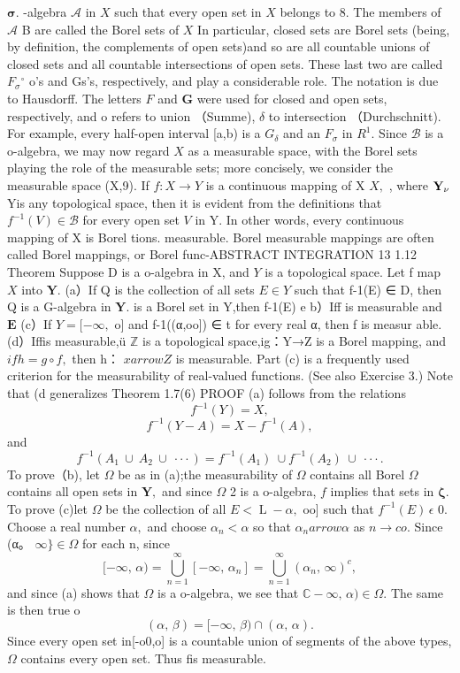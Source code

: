 ${\boldsymbol{\sigma}}.$ -algebra ${\mathcal{A}}$ in $X$ such that every open set in $X$ belongs to 8. The members of ${\mathcal{A}}$ B are called the Borel sets of $\textstyle X$ In particular, closed sets are Borel sets (being, by definition, the complements of open sets)and so are all countable unions of closed sets and all countable intersections of open sets. These last two are called $F_{\sigma}{}^{\circ}$ o's and Gs's, respectively, and play a considerable role. The notation is due to Hausdorff. The letters ${\mathbf{}}F$ and ${\boldsymbol{G}}$ were used for closed and open sets, respectively, and o refers to union （Summe), $\delta$ to intersection （Durchschnitt). For example, every half-open interval [a,b) is a $G_{\delta}$ and an $F_{\sigma}$ in $R^{1}.$ Since $\mathcal{B}$ is a o-algebra, we may now regard $X$ as a measurable space, with the Borel sets playing the role of the measurable sets; more concisely, we consider the measurable space (X,9). If $f\colon X\to Y$ is a continuous mapping of X $X,$ , where ${\bf Y_{\nu}}$ Yis any topological space, then it is evident from the definitions that $f^{-1}(V)\in{\mathcal{B}}$ for every open set ${\mathbf{}}V$ in Y. In other words, every continuous mapping of X is Borel tions. measurable. Borel measurable mappings are often called Borel mappings, or Borel func-ABSTRACT INTEGRATION 13 1.12 Theorem Suppose D is a o-algebra in X, and ${\mathbf{}}Y$ is a topological space. Let f map $X$ into ${\boldsymbol{Y}}.$ (a）If Q is the collection of all sets $\scriptstyle{E\in Y}$ such that f-1(E) ∈ D, then Q is a G-algebra in ${\boldsymbol{Y}}.$ is a Borel set in Y,then f-1(E) e b）Iff is measurable and $\boldsymbol{E}$ (c）If $Y=[-\infty,$ o] and f-1((α,oo]) ∈ t for every real α, then f is measur able. (d）Iffis measurable,ü $\mathbb{Z}$ is a topological space,ig：Y→Z is a Borel mapping, and $i f h=g\circ f,$ then h： $x{\mathrel{ arrow}}Z$ is measurable. Part (c) is a frequently used criterion for the measurability of real-valued functions. (See also Exercise 3.) Note that (d generalizes Theorem 1.7(6) PROOF (a) follows from the relations $$ f^{-1}(Y)=X, $$ $$ f^{-1}(Y-A)=X-f^{-1}(A), $$ and $$ f^{-1}(A_{1}\ \cup\ A_{2}\ \cup\ \cdot\cdot\cdot)=f^{-1}(A_{1})\ \cup f^{-1}(A_{2})\ \cup\ \cdot\cdot\cdot. $$ To prove（b), let $\Omega$ be as in (a);the measurability of $\Omega$ contains all Borel $\Omega$ contains all open sets in ${\boldsymbol{Y}},$ and since $\Omega$ 2 is a o-algebra, $\boldsymbol{\mathit{f}}$ implies that sets in ${\boldsymbol{\zeta}}.$ To prove (c)let $\Omega$ be the collection of all $E<\operatorname{L}-\alpha,$ oo] such that $f^{-1}(E)\,\epsilon$ 0. Choose a real number $\alpha,$ and choose $\alpha_{n}<\alpha$ so that $\alpha_{n} arrow\alpha$ as $n\to c o.$ Since (α。 $\infty\}\in\Omega$ for each n, since $$ [-\infty,\,\alpha)=\bigcup_{n=1}^{\infty}\left[-\infty,\,\alpha_{n}\right]=\bigcup_{n=1}^{\infty}(\alpha_{n},\,\infty)^{c}, $$ and since (a) shows that $\Omega$ is a o-algebra, we see that $\mathbb{C}-\infty,\,\alpha)\in\Omega.$ The same is then true o $$ (\alpha,\,\beta)=[-\infty,\,\beta)\cap(\alpha,\,\alpha). $$ Since every open set in[-o0,o] is a countable union of segments of the above types, $\Omega$ contains every open set. Thus fis measurable. 